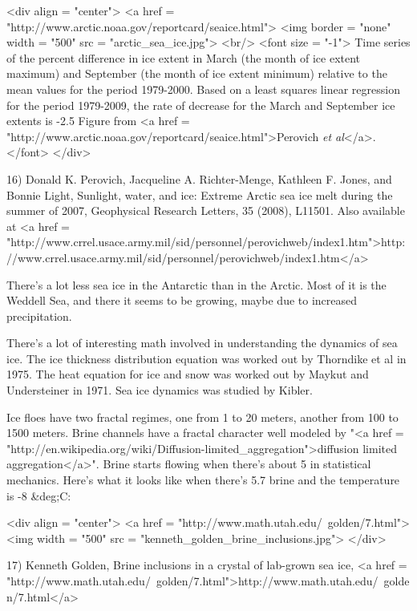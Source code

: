 <div align = "center">
<a href = "http://www.arctic.noaa.gov/reportcard/seaice.html">
<img border = "none" width = "500" src = "arctic_sea_ice.jpg">
<br/>
<font size = "-1">
Time series of the percent difference in ice extent in March (the month of 
ice extent maximum) and September (the month of ice extent minimum) relative 
to the mean values for the period 1979-2000. Based on a least squares linear 
regression for the period 1979-2009, the rate of decrease for the March 
and September ice extents is -2.5%
Figure from <a href = "http://www.arctic.noaa.gov/reportcard/seaice.html">Perovich \emph{et al}</a>.
</font>
</div>

16) Donald K. Perovich, Jacqueline A. Richter-Menge, Kathleen
F. Jones, and Bonnie Light, Sunlight, water, and ice: Extreme Arctic
sea ice melt during the summer of 2007, Geophysical Research Letters,
35 (2008), L11501.  Also available at 
<a href = "http://www.crrel.usace.army.mil/sid/personnel/perovichweb/index1.htm">http://www.crrel.usace.army.mil/sid/personnel/perovichweb/index1.htm</a>

There's a lot less sea ice in the Antarctic than in the Arctic.
Most of it is the Weddell Sea, and there it seems to be
growing, maybe due to increased precipitation.

There's a lot of interesting math involved in understanding the
dynamics of sea ice.  The ice thickness distribution equation was
worked out by Thorndike et al in 1975.  The heat equation for ice and
snow was worked out by Maykut and Understeiner in 1971.  Sea ice
dynamics was studied by Kibler.

Ice floes have two fractal regimes, one from 1 to 20 meters, another
from 100 to 1500 meters.  Brine channels have a fractal character well
modeled by "<a href =
"http://en.wikipedia.org/wiki/Diffusion-limited_aggregation">diffusion
limited aggregation</a>".  Brine starts flowing when there's
about 5%
in statistical mechanics.  Here's what it looks like when there's 5.7%
brine and the temperature is -8 &deg;C:

<div align = "center">
<a href = "http://www.math.utah.edu/~golden/7.html">
<img width = "500" src = "kenneth_golden_brine_inclusions.jpg">
</div>

17) Kenneth Golden, Brine inclusions in a crystal of lab-grown sea
ice, <a href =
"http://www.math.utah.edu/~golden/7.html">http://www.math.utah.edu/~golden/7.html</a>

